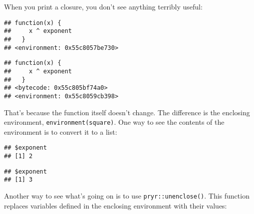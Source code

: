 When you print a closure, you don't see anything terribly useful:

\begin{Shaded}
\begin{Highlighting}[]
\end{Highlighting}
\end{Shaded}

\begin{verbatim}
## function(x) {
##     x ^ exponent
##   }
## <environment: 0x55c8057be730>
\end{verbatim}

\begin{Shaded}
\begin{Highlighting}[]
\end{Highlighting}
\end{Shaded}

\begin{verbatim}
## function(x) {
##     x ^ exponent
##   }
## <bytecode: 0x55c805bf74a0>
## <environment: 0x55c8059cb398>
\end{verbatim}

That's because the function itself doesn't change. The difference is the
enclosing environment, \texttt{environment(square)}. One way to see the
contents of the environment is to convert it to a list:

\begin{Shaded}
\begin{Highlighting}[]
\NormalTok{(}
\end{Highlighting}
\end{Shaded}

\begin{verbatim}
## $exponent
## [1] 2
\end{verbatim}

\begin{Shaded}
\begin{Highlighting}[]
\NormalTok{(}
\end{Highlighting}
\end{Shaded}

\begin{verbatim}
## $exponent
## [1] 3
\end{verbatim}

Another way to see what's going on is to use \texttt{pryr::unenclose()}.
This function replaces variables defined in the enclosing environment
with their values:

